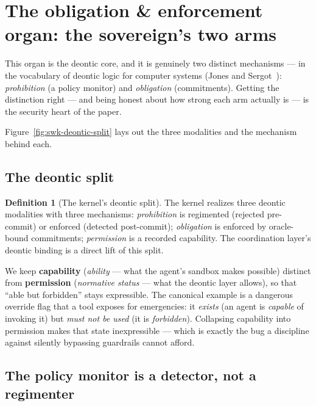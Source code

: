 \documentclass[11pt,a4paper]{article}
\theoremstyle{definition}
\newtheorem{definition}{Definition}[section]
\theoremstyle{remark}
\begin{document}
\section{The obligation \& enforcement organ: the sovereign's two arms}
\label{sec:enforcement}

This organ is the deontic core, and it is genuinely two distinct mechanisms ---
in the vocabulary of deontic logic for computer systems (Jones and
Sergot~\cite{jonessergot1993}): \emph{prohibition} (a policy monitor) and
\emph{obligation} (commitments). Getting the distinction right --- and being honest
about how strong each arm actually is --- is the security heart of the paper.

Figure~\ref{fig:swk-deontic-split} lays out the three modalities and the mechanism
behind each.



\subsection{The deontic split}

\begin{definition}[The kernel's deontic split]\label{def:deontic}
The kernel realizes three deontic modalities with three mechanisms:
\emph{prohibition} is regimented (rejected pre-commit) or enforced (detected
post-commit); \emph{obligation} is enforced by oracle-bound commitments;
\emph{permission} is a recorded capability. The coordination layer's deontic
binding is a direct lift of this split.
\end{definition}

We keep \textbf{capability} (\emph{ability} --- what the agent's sandbox makes
possible) distinct from \textbf{permission} (\emph{normative status} --- what the
deontic layer allows), so that ``able but forbidden'' stays expressible. The
canonical example is a dangerous override flag that a tool exposes for emergencies:
it \emph{exists} (an agent is \emph{capable} of invoking it) but \emph{must not be
used} (it is \emph{forbidden}). Collapsing capability into permission makes that
state inexpressible --- which is exactly the bug a discipline against silently
bypassing guardrails cannot afford.

\subsection{The policy monitor is a detector, not a regimenter}
\label{sec:arbiter-correction}
\end{document}
